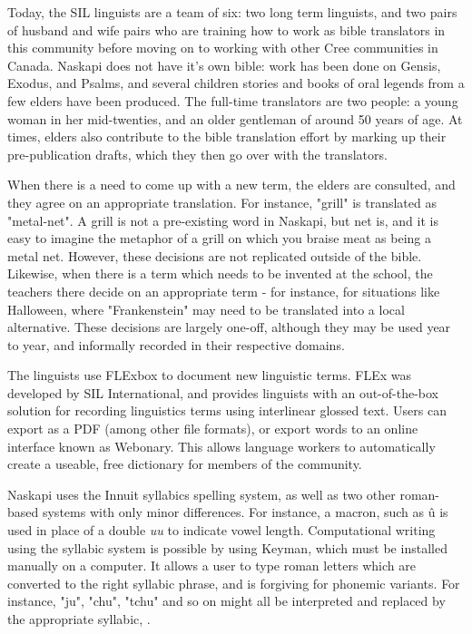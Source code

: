 \documentclass[10pt, a4paper]{article}
\begin{document}
Today, the SIL linguists are a team of six: two long term linguists, and two pairs of husband and wife pairs who are training how to work as bible translators in this community before moving on to working with other Cree communities in Canada. Naskapi does not have it's own bible: work has been done on Gensis, Exodus, and Psalms, and several children stories and books of oral legends from a few elders have been produced. The full-time translators are two people: a young woman in her mid-twenties, and an older gentleman of around 50 years of age. At times, elders also contribute to the bible translation effort by marking up their pre-publication drafts, which they then go over with the translators. 

When there is a need to come up with a new term, the elders are consulted, and they agree on an appropriate translation. For instance, "grill" is translated as "metal-net". A grill is not a pre-existing word in Naskapi, but net is, and it is easy to imagine the metaphor of a grill on which you braise meat as being a metal net. However, these decisions are not replicated outside of the bible. Likewise, when there is a term which needs to be invented at the school, the teachers there decide on an appropriate term - for instance, for situations like Halloween, where "Frankenstein" may need to be translated into a local alternative. These decisions are largely one-off, although they may be used year to year, and informally recorded in their respective domains.

The linguists use FLExbox %
to document new linguistic terms. FLEx was developed by SIL International, and provides linguists with an out-of-the-box solution for recording linguistics terms using interlinear glossed text. Users can export as a PDF (among other file formats), or export words to an online interface known as Webonary. %
This allows language workers to automatically create a useable, free dictionary for members of the community.

Naskapi uses the Innuit syllabics spelling system,   %
as well as two other roman-based systems with only minor differences. For instance, a macron, such as \^u is used in place of a double \emph{uu} to indicate vowel length. Computational writing using the syllabic system is possible by using Keyman, %
which must be installed manually on a computer. It allows a user to type roman letters which are converted to the right syllabic phrase, and is forgiving for phonemic variants. For instance, "ju", "chu", "tchu" and so on might all be interpreted and replaced by the appropriate syllabic, .%
\end{document}
